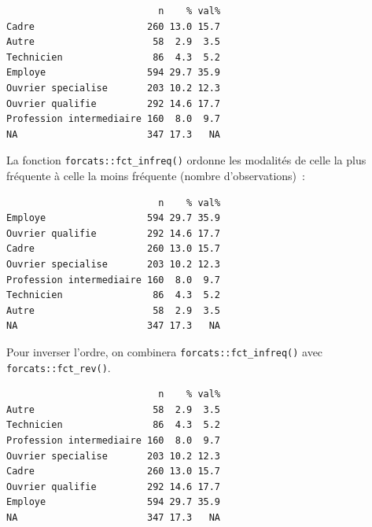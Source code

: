 \documentclass[
  letterpaper,
  DIV=11,
  numbers=noendperiod,
  oneside]{scrreprt}
\newenvironment{Shaded}{\begin{snugshade}}{\end{snugshade}}
\newcommand{\FunctionTok}[1]{\textcolor[rgb]{0.28,0.35,0.67}{#1}}
\newcommand{\NormalTok}[1]{\textcolor[rgb]{0.00,0.23,0.31}{#1}}
\newcommand{\SpecialCharTok}[1]{\textcolor[rgb]{0.37,0.37,0.37}{#1}}
\begin{document}
\begin{verbatim}
                           n    % val%
Cadre                    260 13.0 15.7
Autre                     58  2.9  3.5
Technicien                86  4.3  5.2
Employe                  594 29.7 35.9
Ouvrier specialise       203 10.2 12.3
Ouvrier qualifie         292 14.6 17.7
Profession intermediaire 160  8.0  9.7
NA                       347 17.3   NA
\end{verbatim}

La fonction \texttt{forcats::fct\_infreq()} ordonne les modalités de
celle la plus fréquente à celle la moins fréquente (nombre
d'observations)~:

\begin{Shaded}
\end{Shaded}

\begin{verbatim}
                           n    % val%
Employe                  594 29.7 35.9
Ouvrier qualifie         292 14.6 17.7
Cadre                    260 13.0 15.7
Ouvrier specialise       203 10.2 12.3
Profession intermediaire 160  8.0  9.7
Technicien                86  4.3  5.2
Autre                     58  2.9  3.5
NA                       347 17.3   NA
\end{verbatim}

Pour inverser l'ordre, on combinera \texttt{forcats::fct\_infreq()} avec
\texttt{forcats::fct\_rev()}.

\begin{Shaded}
\end{Shaded}

\begin{verbatim}
                           n    % val%
Autre                     58  2.9  3.5
Technicien                86  4.3  5.2
Profession intermediaire 160  8.0  9.7
Ouvrier specialise       203 10.2 12.3
Cadre                    260 13.0 15.7
Ouvrier qualifie         292 14.6 17.7
Employe                  594 29.7 35.9
NA                       347 17.3   NA
\end{verbatim}
\end{document}
